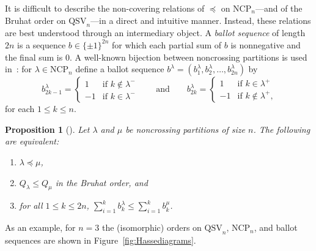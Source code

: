 \documentclass[12pt]{amsart}
\newtheorem{prop}[equation]{Proposition}
\theoremstyle{definition}
\theoremstyle{remark}
\numberwithin{equation}{section}
\newcommand{\QSV}{\mathrm{QSV}}
\newcommand{\NCP}{\mathrm{NCP}}
\begin{document}
It is difficult to describe the non-covering relations of $\preceq$ on $\NCP_{n}$---and of the Bruhat order on $\QSV_{n}$---in a direct and intuitive manner.  Instead, these relations are best understood through an intermediary object.  A \emph{ballot sequence} of length $2n$ is a sequence $b \in \{\pm1\}^{2n}$ for which each partial sum of $b$ is nonnegative and the final sum is $0$.  A well-known bijection between noncrossing partitions is used in~\cite[Section~5.1]{GobetWilliams}: for $\lambda \in \NCP_{n}$ define a ballot sequence $b^{\lambda} = (b^{\lambda}_{1}, b^{\lambda}_{2}, \ldots, b^{\lambda}_{2n})$  by
\[
b^{\lambda}_{2 k - 1} = \begin{cases} 1 & \text{if $k \notin \lambda^{-}$} \\ -1 & \text{if $k \in \lambda^{-}$} \end{cases}
\qquad
\text{and}
\qquad
b^{\lambda}_{2 k} = \begin{cases} 1 & \text{if $k \in \lambda^{+}$} \\ -1 & \text{if $k \notin \lambda^{+}$,} \end{cases}
\]
for each $1 \le k \le n$.

\begin{prop}[{\cite[Theorem 1.1 and Corollary 7.5]{GobetWilliams}}]
\label{prop:QSVorderbijection}
Let $\lambda$ and $\mu$ be noncrossing partitions of size $n$.  The following are equivalent:
\begin{enumerate}
\item $\lambda \preceq \mu$, 

\item $Q_{\lambda} \le Q_{\mu}$ in the Bruhat order, and

\item for all $1 \le k \le 2n$, $\sum_{i = 1}^{k} b^{\lambda}_{k} \le \sum_{i = 1}^{k} b^{\mu}_{k}$.

\end{enumerate}
\end{prop}

As an example, for $n = 3$ the (isomorphic) orders on $\QSV_{n}$, $\NCP_{n}$, and ballot sequences are shown in Figure~\ref{fig:Hassediagrams}.
\end{document}
